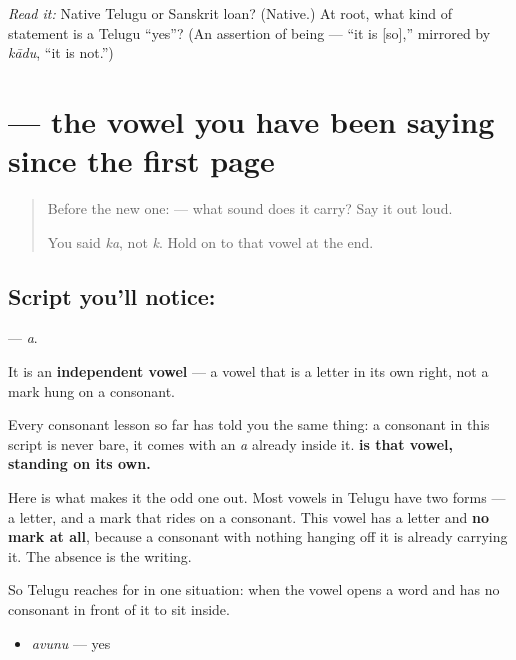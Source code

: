 \begin{tcolorbox}[breakable,colback=teal!4,colframe=teal!35!black,title={Before you move on}]
\emph{Read it:} \textbf{} Native Telugu or Sanskrit loan? (Native.) At root, what kind of statement is a Telugu \textquotedblleft{}yes\textquotedblright{}? (An assertion of being — \textquotedblleft{}it is {[}so{]},\textquotedblright{} mirrored by \emph{kādu}, \textquotedblleft{}it is not.\textquotedblright{})
\end{tcolorbox}
\section[\texorpdfstring{\te{అ} (a)}{అ (a)}]{ — the vowel you have been saying since the first page}

\label{lesson:TE-S162-letter-a}



\begin{quote}
Before the new one:  — what sound does it carry? Say it out loud.

You said \emph{ka}, not \emph{k}. Hold on to that vowel at the end.
\end{quote}

\subsection*{Script you'll notice: }
\textbf{} — \emph{a}.

It is an \textbf{independent vowel} — a vowel that is a letter in its own right, not a mark hung on a consonant.

Every consonant lesson so far has told you the same thing: a consonant in this script is never bare, it comes with an \emph{a} already inside it. \textbf{ is that vowel, standing on its own.}

Here is what makes it the odd one out. Most vowels in Telugu have two forms — a letter, and a mark that rides on a consonant. This vowel has a letter and \textbf{no mark at all}, because a consonant with nothing hanging off it is already carrying it. The absence is the writing.

So Telugu reaches for  in one situation: when the vowel opens a word and has no consonant in front of it to sit inside.

\begin{itemize}
\raggedright
  \item \textbf{} \emph{avunu} — yes
\end{itemize}

